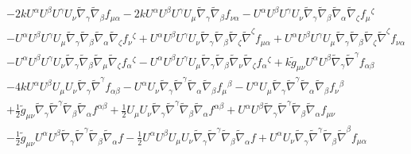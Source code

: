\documentclass[10pt,letterpaper]{article}
\numberwithin{equation}{section}
\begin{document}
\begin{eqnarray}
&& - 2 k U^{\alpha } U^{\beta } U^{\gamma } U_{\nu } \tilde{\nabla}_{\gamma }\tilde{\nabla}_{\beta }f_{\mu \alpha } - 2 k U^{\alpha } U^{\beta } U^{\gamma } U_{\mu } \tilde{\nabla}_{\gamma }\tilde{\nabla}_{\beta }f_{\nu \alpha } -  U^{\alpha } U^{\beta } U^{\gamma } U_{\nu } \tilde{\nabla}_{\gamma }\tilde{\nabla}_{\beta }\tilde{\nabla}_{\alpha }\tilde{\nabla}_{\zeta }f_{\mu }{}^{\zeta } \nonumber \\ 
&& -  U^{\alpha } U^{\beta } U^{\gamma } U_{\mu } \tilde{\nabla}_{\gamma }\tilde{\nabla}_{\beta }\tilde{\nabla}_{\alpha }\tilde{\nabla}_{\zeta }f_{\nu }{}^{\zeta } + U^{\alpha } U^{\beta } U^{\gamma } U_{\nu } \tilde{\nabla}_{\gamma }\tilde{\nabla}_{\beta }\tilde{\nabla}_{\zeta }\tilde{\nabla}^{\zeta }f_{\mu \alpha } + U^{\alpha } U^{\beta } U^{\gamma } U_{\mu } \tilde{\nabla}_{\gamma }\tilde{\nabla}_{\beta }\tilde{\nabla}_{\zeta }\tilde{\nabla}^{\zeta }f_{\nu \alpha } \nonumber \\ 
&& -  U^{\alpha } U^{\beta } U^{\gamma } U_{\nu } \tilde{\nabla}_{\gamma }\tilde{\nabla}_{\beta }\tilde{\nabla}_{\mu }\tilde{\nabla}_{\zeta }f_{\alpha }{}^{\zeta } -  U^{\alpha } U^{\beta } U^{\gamma } U_{\mu } \tilde{\nabla}_{\gamma }\tilde{\nabla}_{\beta }\tilde{\nabla}_{\nu }\tilde{\nabla}_{\zeta }f_{\alpha }{}^{\zeta } + k \tilde{g}_{\mu \nu } U^{\alpha } U^{\beta } \tilde{\nabla}_{\gamma }\tilde{\nabla}^{\gamma }f_{\alpha \beta } \nonumber \\ 
&& - 4 k U^{\alpha } U^{\beta } U_{\mu } U_{\nu } \tilde{\nabla}_{\gamma }\tilde{\nabla}^{\gamma }f_{\alpha \beta } -  U^{\alpha } U_{\nu } \tilde{\nabla}_{\gamma }\tilde{\nabla}^{\gamma }\tilde{\nabla}_{\alpha }\tilde{\nabla}_{\beta }f_{\mu }{}^{\beta } -  U^{\alpha } U_{\mu } \tilde{\nabla}_{\gamma }\tilde{\nabla}^{\gamma }\tilde{\nabla}_{\alpha }\tilde{\nabla}_{\beta }f_{\nu }{}^{\beta } \nonumber \\ 
&& + \tfrac{1}{2} \tilde{g}_{\mu \nu } \tilde{\nabla}_{\gamma }\tilde{\nabla}^{\gamma }\tilde{\nabla}_{\beta }\tilde{\nabla}_{\alpha }f^{\alpha \beta } + \tfrac{1}{2} U_{\mu } U_{\nu } \tilde{\nabla}_{\gamma }\tilde{\nabla}^{\gamma }\tilde{\nabla}_{\beta }\tilde{\nabla}_{\alpha }f^{\alpha \beta } + U^{\alpha } U^{\beta } \tilde{\nabla}_{\gamma }\tilde{\nabla}^{\gamma }\tilde{\nabla}_{\beta }\tilde{\nabla}_{\alpha }f_{\mu \nu } \nonumber \\ 
&& -  \tfrac{1}{2} \tilde{g}_{\mu \nu } U^{\alpha } U^{\beta } \tilde{\nabla}_{\gamma }\tilde{\nabla}^{\gamma }\tilde{\nabla}_{\beta }\tilde{\nabla}_{\alpha }f -  \tfrac{1}{2} U^{\alpha } U^{\beta } U_{\mu } U_{\nu } \tilde{\nabla}_{\gamma }\tilde{\nabla}^{\gamma }\tilde{\nabla}_{\beta }\tilde{\nabla}_{\alpha }f + U^{\alpha } U_{\nu } \tilde{\nabla}_{\gamma }\tilde{\nabla}^{\gamma }\tilde{\nabla}_{\beta }\tilde{\nabla}^{\beta }f_{\mu \alpha } \nonumber \\ 

\end{eqnarray}
\end{document}
